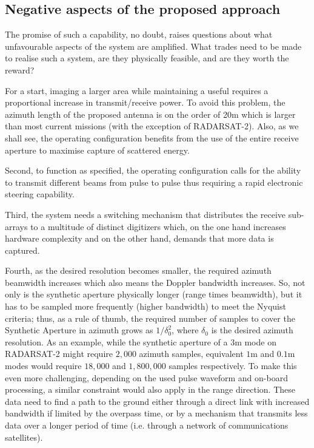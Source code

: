 \subsection{Negative aspects of the proposed approach}
The promise of such a capability, no doubt, raises questions about what unfavourable aspects of the system are amplified. What trades need to be made to realise such a system, are they physically feasible, and are they worth the reward? 
\par
For a start, imaging a larger area while maintaining a useful  requires a proportional increase in transmit/receive power. To avoid this problem, the azimuth length of the proposed antenna is on the order of 20m which is larger than most current missions (with the exception of RADARSAT-2). Also, as we shall see, the operating configuration benefits from the use of the entire receive aperture to maximise capture of scattered energy. 
\par
Second, to function as specified, the operating configuration calls for the ability to transmit different beams from pulse to pulse thus requiring a rapid electronic steering capability. 
\par
Third, the system needs a switching mechanism that distributes the receive sub-arrays to a multitude of distinct digitizers which, on the one hand increases hardware complexity and on the other hand, demands that more data is captured. 
\par
Fourth, as the desired resolution becomes smaller, the required azimuth beamwidth increases which also means the Doppler bandwidth increases. So, not only is the synthetic aperture physically longer (range times beamwidth), but it has to be sampled more frequently (higher bandwidth) to meet the Nyquist criteria; thus, as a rule of thumb, the required number of samples to cover the Synthetic Aperture in azimuth grows as $1/\delta_0^2$, where $\delta_0$ is the desired azimuth resolution. As an example, while the synthetic aperture of a $3\text{m}$ mode on RADARSAT-2 might require $2,000$ azimuth samples, equivalent $1\text{m}$ and $0.1\text{m}$ modes would require $18,000$ and $1,800,000$ samples respectively. To make this even more challenging, depending on the used pulse waveform and on-board processing, a similar constraint would also apply in the range direction. These data need to find a path to the ground either through a direct link with increased bandwidth if limited by the overpass time, or by a mechanism that transmits less data over a longer period of time (i.e. through a network of communications satellites).
